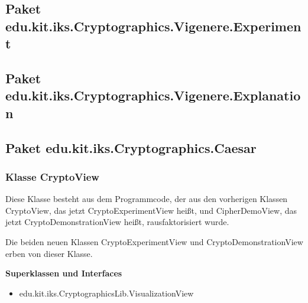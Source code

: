 \documentclass{article}
\begin{document}
  \subsection{Paket edu.kit.iks.Cryptographics.Vigenere.Experiment}

  \subsection{Paket edu.kit.iks.Cryptographics.Vigenere.Explanation}

  \subsection{Paket edu.kit.iks.Cryptographics.Caesar}
   \subsubsection{Klasse CryptoView}
          Diese Klasse besteht aus dem Programmcode, der aus den vorherigen Klassen CryptoView, das jetzt CryptoExperimentView heißt,
          und CipherDemoView, das jetzt CryptoDemonstrationView heißt, rausfaktorisiert wurde.
          
          Die beiden neuen Klassen CryptoExperimentView und CryptoDemonstrationView erben von dieser Klasse.\newline
           
    \textbf{Superklassen und Interfaces}
      \begin{itemize}
        \item  edu.kit.iks.CryptographicsLib.VisualizationView
      \end{itemize}
           
\end{document}
